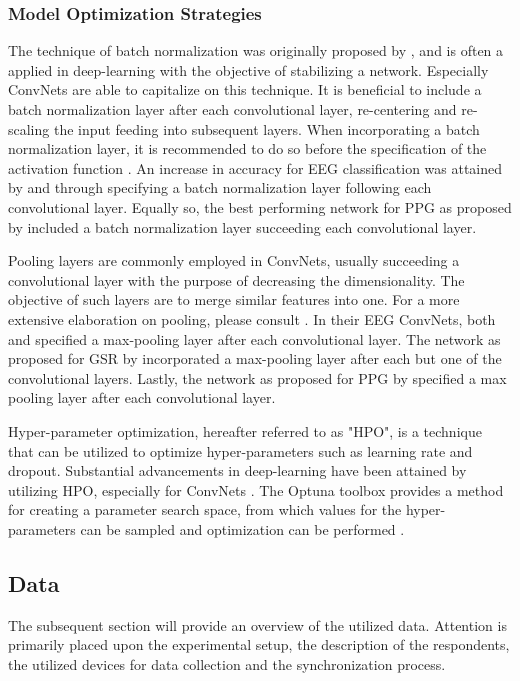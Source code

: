 \documentclass[12pt]{article}
\begin{document}
\subsubsection{Model Optimization Strategies}
The technique of batch normalization was originally proposed by , and is often a applied in deep-learning with the objective of stabilizing a network. Especially ConvNets are able to capitalize on this technique. It is beneficial to include a batch normalization layer after each convolutional layer, re-centering and re-scaling the input feeding into subsequent layers. When incorporating a batch normalization layer, it is recommended to do so before the specification of the activation function \cite{ioffe2015batch}. An increase in accuracy for EEG classification was attained by  and  through specifying a batch normalization layer following each convolutional layer. Equally so, the best performing network for PPG as proposed by  included a batch normalization layer succeeding each convolutional layer. 

Pooling layers are commonly employed in ConvNets, usually succeeding a convolutional layer with the purpose of decreasing the dimensionality. The objective of such layers are to merge similar features into one. For a more extensive elaboration on pooling, please consult . In their EEG ConvNets, both  and  specified a max-pooling layer after each convolutional layer. The network as proposed for GSR by  incorporated a max-pooling layer after each but one of the convolutional layers. Lastly, the network as proposed for PPG by \cite{biswas2019cornet} specified a max pooling layer after each convolutional layer. 

Hyper-parameter optimization, hereafter referred to as "HPO", is a technique that can be utilized to optimize hyper-parameters such as learning rate and dropout. Substantial advancements in deep-learning have been attained by utilizing HPO, especially for ConvNets \cite{bergstra2012random}. The Optuna toolbox provides a method for creating a parameter search space, from which values for the hyper-parameters can be sampled and optimization can be performed \cite{akiba2019optuna}. 
\bigskip 

\subsection{Data}
The subsequent section will provide an overview of the utilized data. Attention is primarily placed upon the experimental setup, the description of the respondents, the utilized devices for data collection and the synchronization process. 
\end{document}
